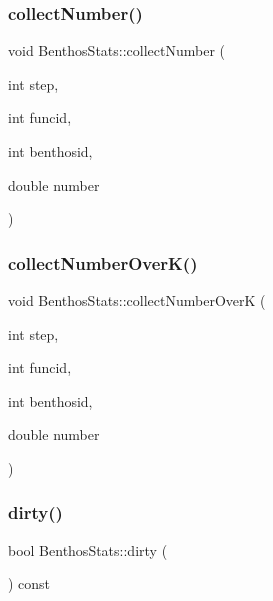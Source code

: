 \mbox{\label{class_benthos_stats_aad2a3c2de311f528b1e16bdf26effc2f}} 
\subsubsection{\texorpdfstring{collectNumber()}{collectNumber()}}
{\footnotesize\ttfamily void Benthos\+Stats\+::collect\+Number (\begin{DoxyParamCaption}\item[{int}]{step,  }\item[{int}]{funcid,  }\item[{int}]{benthosid,  }\item[{double}]{number }\end{DoxyParamCaption})}

\mbox{\label{class_benthos_stats_a02203ec3e33bbbb3a69a072ad8260ab4}} 
\subsubsection{\texorpdfstring{collectNumberOverK()}{collectNumberOverK()}}
{\footnotesize\ttfamily void Benthos\+Stats\+::collect\+Number\+OverK (\begin{DoxyParamCaption}\item[{int}]{step,  }\item[{int}]{funcid,  }\item[{int}]{benthosid,  }\item[{double}]{number }\end{DoxyParamCaption})}

\mbox{\label{class_benthos_stats_a875f7528f92e7d28e0c4f48891ce1692}} 
\subsubsection{\texorpdfstring{dirty()}{dirty()}}
{\footnotesize\ttfamily bool Benthos\+Stats\+::dirty (\begin{DoxyParamCaption}{ }\end{DoxyParamCaption}) const\hspace{0.3cm}{\ttfamily [inline]}}


